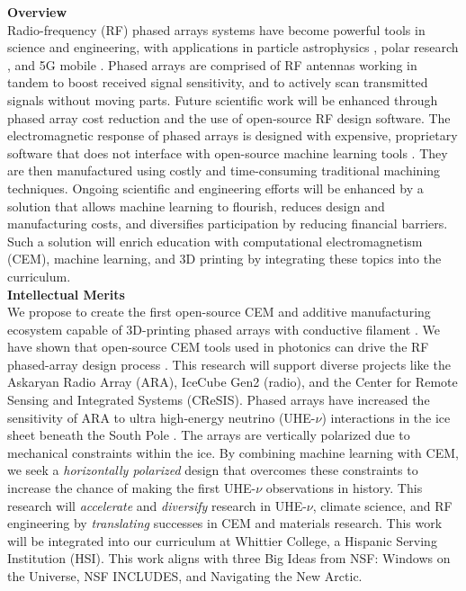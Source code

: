 \documentclass[11pt]{amsart}
\begin{document}

\noindent \textbf{Overview} \\ \noindent Radio-frequency (RF) phased arrays systems have become powerful tools in science and engineering, with applications in particle astrophysics \cite{Vieregg_2016,AVVA201746,electronics10040415,rno}, polar research \cite{arnold_2020,9670670}, and 5G mobile \cite{5G_review_paper}.  Phased arrays are comprised of RF antennas working in tandem to boost received signal sensitivity, and to actively scan transmitted signals without moving parts.  Future scientific work will be enhanced through phased array cost reduction and the use of open-source RF design software.  The electromagnetic response of phased arrays is designed with expensive, proprietary software that does not interface with open-source machine learning tools \cite{10.3390/electronics8121506}.  They are then manufactured using costly and time-consuming traditional machining techniques.  Ongoing scientific and engineering efforts will be enhanced by a solution that allows machine learning to flourish, reduces design and manufacturing costs, and diversifies participation by reducing financial barriers.  Such a solution will enrich education with computational electromagnetism (CEM), machine learning, and 3D printing by integrating these topics into the curriculum. \\

\noindent \textbf{Intellectual Merits} \\ \noindent We propose to create the first open-source CEM and additive manufacturing ecosystem capable of 3D-printing phased arrays with conductive filament \cite{10.3390/electronics8121506, yurduseven,8786183}.  We have shown that open-source CEM tools used in photonics can drive the RF phased-array design process \cite{electronics10040415}.  This research will support diverse projects like the Askaryan Radio Array (ARA), IceCube Gen2 (radio), and the Center for Remote Sensing and Integrated Systems (CReSIS).  Phased arrays have increased the sensitivity of ARA to ultra high-energy neutrino (UHE-$\nu$) interactions in the ice sheet beneath the South Pole \cite{PhysRevD.105.122006}.  The arrays are vertically polarized due to mechanical constraints within the ice.  By combining machine learning with CEM, we seek a \textit{horizontally polarized} design that overcomes these constraints to increase the chance of making the first UHE-$\nu$ observations in history.  This research will \textit{accelerate} and \textit{diversify} research in UHE-$\nu$, climate science, and RF engineering by \textit{translating} successes in CEM and materials research.  This work will be integrated into our curriculum at Whittier College, a Hispanic Serving Institution (HSI).  This work aligns with three Big Ideas from NSF: Windows on the Universe, NSF INCLUDES, and Navigating the New Arctic. \\
\end{document}
